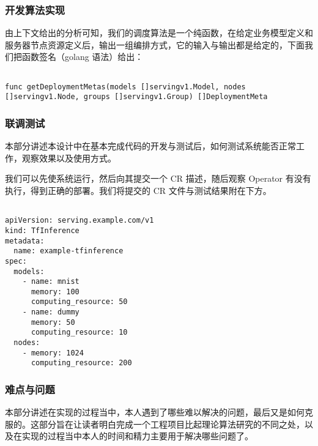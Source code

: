 \subsubsection{开发算法实现}

由上下文给出的分析可知，我们的调度算法是一个纯函数，在给定业务模型定义和服务器节点资源定义后，输出一组编排方式，它的输入与输出都是给定的，下面我们把函数签名（golang 语法）给出：

\begin{lstlisting}

func getDeploymentMetas(models []servingv1.Model, nodes []servingv1.Node, groups []servingv1.Group) []DeploymentMeta

\end{lstlisting}

\subsubsection{联调测试}

本部分讲述本设计中在基本完成代码的开发与测试后，如何测试系统能否正常工作，观察效果以及使用方式。

我们可以先使系统运行，然后向其提交一个 CR 描述，随后观察 Operator 有没有执行，得到正确的部署。我们将提交的 CR 文件与测试结果附在下方。

\begin{lstlisting}

apiVersion: serving.example.com/v1
kind: TfInference
metadata:
  name: example-tfinference
spec:
  models:
    - name: mnist
      memory: 100
      computing_resource: 50
    - name: dummy
      memory: 50
      computing_resource: 10
  nodes:
    - memory: 1024
      computing_resource: 200

\end{lstlisting}




\subsubsection{难点与问题}

本部分讲述在实现的过程当中，本人遇到了哪些难以解决的问题，最后又是如何克服的。这部分旨在让读者明白完成一个工程项目比起理论算法研究的不同之处，以及在实现的过程当中本人的时间和精力主要用于解决哪些问题了。

